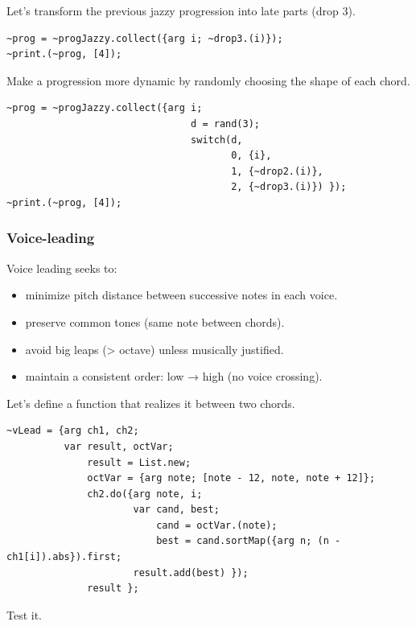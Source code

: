 Let's transform the previous jazzy progression into late parts (drop 3).

\begin{lstlisting}[frame=single] 
~prog = ~progJazzy.collect({arg i; ~drop3.(i)});             
~print.(~prog, [4]);
\end{lstlisting}

Make a progression more dynamic by randomly choosing the shape of each chord.

\begin{lstlisting}[frame=single] 
~prog = ~progJazzy.collect({arg i;
                                d = rand(3);
                                switch(d,
                                       0, {i},
                                       1, {~drop2.(i)},
                                       2, {~drop3.(i)}) });
~print.(~prog, [4]);
\end{lstlisting}

\subsubsection{Voice-leading}\label{voice-leading}

Voice leading seeks to:

\begin{itemize}
\tightlist
\item minimize pitch distance between successive notes in each voice.
\item preserve common tones (same note between chords).
\item avoid big leaps (> octave) unless musically justified.
\item maintain a consistent order: low → high (no voice crossing).
\end{itemize}

Let's define a function that realizes it between two chords.

\begin{lstlisting}[frame=single, caption=voice-leading model function] 
~vLead = {arg ch1, ch2;
          var result, octVar;
              result = List.new;
              octVar = {arg note; [note - 12, note, note + 12]};
              ch2.do({arg note, i;
                      var cand, best;
                          cand = octVar.(note);
                          best = cand.sortMap({arg n; (n - ch1[i]).abs}).first;
                      result.add(best) });
              result };
\end{lstlisting}

Test it.

